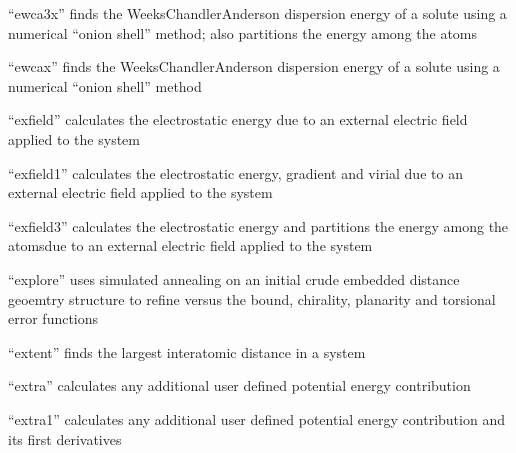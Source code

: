 \documentclass[letterpaper,11pt,english]{sphinxmanual}
\begin{document}
\sphinxAtStartPar
{}

\sphinxAtStartPar
“ewca3x” finds the Weeks\sphinxhyphen{}Chandler\sphinxhyphen{}Anderson dispersion energy of a solute using a numerical “onion shell” method; also partitions the energy among the atoms

\sphinxAtStartPar
{}

\sphinxAtStartPar
“ewcax” finds the Weeks\sphinxhyphen{}Chandler\sphinxhyphen{}Anderson dispersion energy of a solute using a numerical “onion shell” method

\sphinxAtStartPar
{}

\sphinxAtStartPar
“exfield” calculates the electrostatic energy due to an external electric field applied to the system

\sphinxAtStartPar
{}

\sphinxAtStartPar
“exfield1” calculates the electrostatic energy, gradient and virial due to an external electric field applied to the system

\sphinxAtStartPar
{}

\sphinxAtStartPar
“exfield3” calculates the electrostatic energy and partitions the energy among the atomsdue to an external electric field applied to the system

\sphinxAtStartPar
{}

\sphinxAtStartPar
“explore” uses simulated annealing on an initial crude embedded distance geoemtry structure to refine versus the bound, chirality, planarity and torsional error functions

\sphinxAtStartPar
{}

\sphinxAtStartPar
“extent” finds the largest interatomic distance in a system

\sphinxAtStartPar
{}

\sphinxAtStartPar
“extra” calculates any additional user defined potential energy contribution

\sphinxAtStartPar
{}

\sphinxAtStartPar
“extra1” calculates any additional user defined potential energy contribution and its first derivatives

\sphinxAtStartPar
{}
\end{document}
